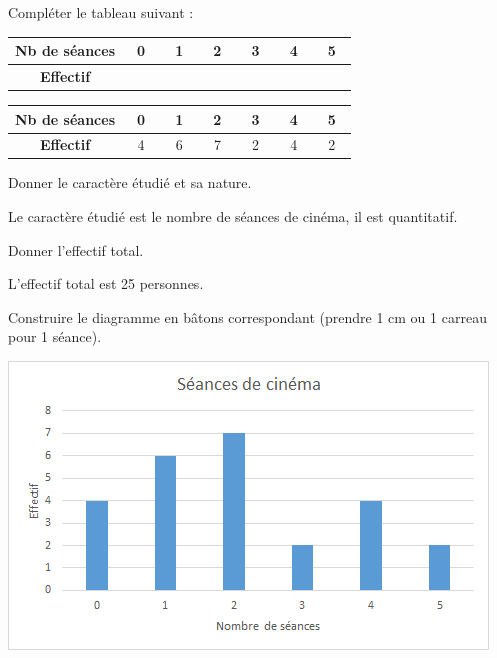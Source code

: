 \documentclass[a4paper,11pt]{exam}
\begin{document}
	\begin{questions}
		\question Compléter le tableau suivant :
		
		\begin{center}
			\begin{tabular}{|@{\ }c@{\ }|@{\ }c@{\ }|@{\ }c@{\ }|@{\ }c@{\ }|@{\ }c@{\ }|@{\ }c@{\ }|@{\ }c@{\ }|}
				\hline
				\textbf{Nb de séances} & \ 0\  & \ 1\  & \ 2\  & \ 3\  & \ 4\  & \ 5\ \\
				\hline
				\textbf{Effectif} &  &   &  &  & &\\
				
				\hline
			\end{tabular}
		\end{center}
		
		\begin{solution}
			
			\begin{center}
				\begin{tabular}{|@{\ }c@{\ }|@{\ }c@{\ }|@{\ }c@{\ }|@{\ }c@{\ }|@{\ }c@{\ }|@{\ }c@{\ }|@{\ }c@{\ }|}
					\hline
					\textbf{Nb de séances} & \ 0\  & \ 1\  & \ 2\  & \ 3\  & \ 4\  & \ 5\ \\
					\hline
					\textbf{Effectif} & 4 & 6  & 7 & 2 & 4 & 2 \\
					
					\hline
				\end{tabular}
			\end{center}
			
		\end{solution}
		
		\question Donner le caractère étudié et sa nature.
		\begin{solution}
			Le caractère étudié est le nombre de séances de cinéma, il est quantitatif.
		\end{solution}
		
		\question Donner l'effectif total.
		\begin{solution}
			L'effectif total est 25 personnes.
		\end{solution}
		
		\question Construire le diagramme en bâtons correspondant (prendre 1 cm ou 1 carreau pour 1 séance).
		\begin{solution}
			\begin{center}
				\includegraphics[scale=0.6]{./cine}
			\end{center} 
		\end{solution}
	\end{questions}
\end{document}
